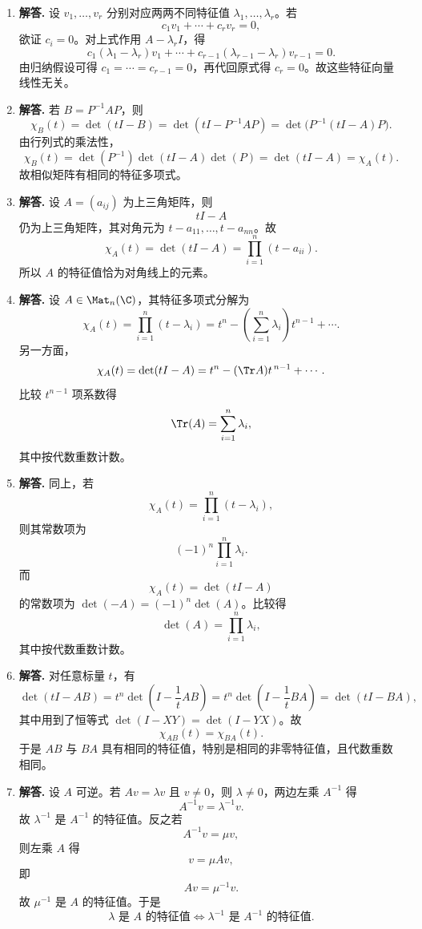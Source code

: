 \begin{enumerate}[label=\textbf{\arabic*.}, leftmargin=*, itemsep=1em]
\item \textbf{解答.} 设 \(v_1,\dots,v_r\) 分别对应两两不同特征值 \(\lambda_1,\dots,\lambda_r\)。若
\[
c_1v_1+\cdots+c_rv_r=0,
\]
欲证 \(c_i=0\)。对上式作用 \(A-\lambda_r I\)，得
\[
c_1(\lambda_1-\lambda_r)v_1+\cdots+c_{r-1}(\lambda_{r-1}-\lambda_r)v_{r-1}=0.
\]
由归纳假设可得 \(c_1=\cdots=c_{r-1}=0\)，再代回原式得 \(c_r=0\)。故这些特征向量线性无关。

\item \textbf{解答.} 若 \(B=P^{-1}AP\)，则
\[
\chi_B(t)=\det(tI-B)=\det(tI-P^{-1}AP)
=\det\bigl(P^{-1}(tI-A)P\bigr).
\]
由行列式的乘法性，
\[
\chi_B(t)=\det(P^{-1})\det(tI-A)\det(P)=\det(tI-A)=\chi_A(t).
\]
故相似矩阵有相同的特征多项式。

\item \textbf{解答.} 设 \(A=(a_{ij})\) 为上三角矩阵，则
\[
tI-A
\]
仍为上三角矩阵，其对角元为 \(t-a_{11},\dots,t-a_{nn}\)。故
\[
\chi_A(t)=\det(tI-A)=\prod_{i=1}^n (t-a_{ii}).
\]
所以 \(A\) 的特征值恰为对角线上的元素。

\item \textbf{解答.} 设 \(A\in\Mat_n(\C)\)，其特征多项式分解为
\[
\chi_A(t)=\prod_{i=1}^n (t-\lambda_i)
= t^n-\left(\sum_{i=1}^n\lambda_i\right)t^{n-1}+\cdots .
\]
另一方面，
\[
\chi_A(t)=\det(tI-A)=t^n-(\Tr A)t^{\,n-1}+\cdots .
\]
比较 \(t^{n-1}\) 项系数得
\[
\Tr(A)=\sum_{i=1}^n \lambda_i,
\]
其中按代数重数计数。

\item \textbf{解答.} 同上，若
\[
\chi_A(t)=\prod_{i=1}^n (t-\lambda_i),
\]
则其常数项为
\[
(-1)^n\prod_{i=1}^n \lambda_i.
\]
而
\[
\chi_A(t)=\det(tI-A)
\]
的常数项为 \(\det(-A)=(-1)^n\det(A)\)。比较得
\[
\det(A)=\prod_{i=1}^n \lambda_i,
\]
其中按代数重数计数。

\item \textbf{解答.} 对任意标量 \(t\)，有
\[
\det(tI-AB)=t^n\det\!\left(I-\frac1t AB\right)
=t^n\det\!\left(I-\frac1t BA\right)=\det(tI-BA),
\]
其中用到了恒等式 \(\det(I-XY)=\det(I-YX)\)。故
\[
\chi_{AB}(t)=\chi_{BA}(t).
\]
于是 \(AB\) 与 \(BA\) 具有相同的特征值，特别是相同的非零特征值，且代数重数相同。

\item \textbf{解答.} 设 \(A\) 可逆。若 \(Av=\lambda v\) 且 \(v\neq0\)，则 \(\lambda\neq0\)，两边左乘 \(A^{-1}\) 得
\[
A^{-1}v=\lambda^{-1}v.
\]
故 \(\lambda^{-1}\) 是 \(A^{-1}\) 的特征值。反之若
\[
A^{-1}v=\mu v,
\]
则左乘 \(A\) 得
\[
v=\mu Av,
\]
即
\[
Av=\mu^{-1}v.
\]
故 \(\mu^{-1}\) 是 \(A\) 的特征值。于是
\[
\lambda\text{ 是 }A\text{ 的特征值}\iff \lambda^{-1}\text{ 是 }A^{-1}\text{ 的特征值}.
\]


\end{enumerate}
